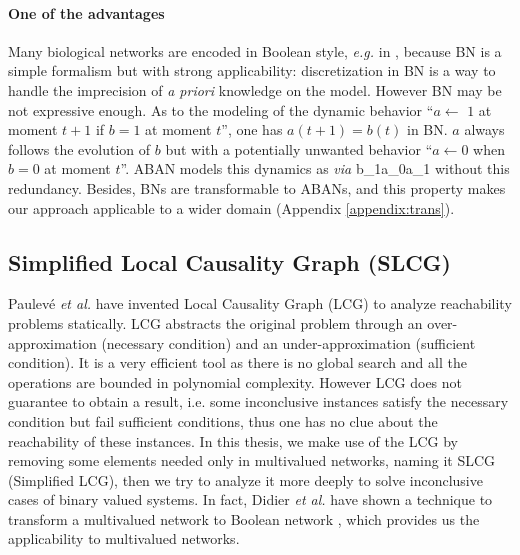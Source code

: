 \paragraph{\textbf{One of the advantages}}
Many biological networks are encoded in Boolean style, \textit{e.g.} in \cite{akutsu2007control,kauffman1969}, because BN is a simple formalism but with strong applicability: discretization in BN is a way to handle the imprecision of \textit{a priori} knowledge on the model.
However BN may be not expressive enough.
As to the modeling of the dynamic behavior ``$a\gets$ $1$ at moment $t+1$ if $b=1$ at moment $t$'', one has $a(t+1)=b(t)$ in BN.
$a$ always follows the evolution of $b$ but with a potentially unwanted behavior ``$a\gets 0$ when $b=0$ at moment $t$''.
ABAN models this dynamics as \textit{via} \ac{b_1}{a_0}{a_1} without this redundancy. 
Besides, BNs are transformable to ABANs, and this property makes our approach applicable to a wider domain (Appendix \ref{appendix:trans}).

\subsection{Simplified Local Causality Graph (SLCG)}\label{sec:SLCG}
Paulev\'e \textit{et al.} \cite{pauleve2011} have invented Local Causality Graph (LCG) to analyze reachability problems statically.
LCG abstracts the original problem through an over-approximation (necessary condition) and an under-approximation (sufficient condition).
It is a very efficient tool as there is no global search and all the operations are bounded in polynomial complexity.
However LCG does not guarantee to obtain a result, i.e. some inconclusive instances satisfy the necessary condition but fail sufficient conditions, thus one has no clue about the reachability of these instances.
In this thesis, we make use of the LCG by removing some elements needed only in multivalued networks, naming it SLCG (Simplified LCG), then we try to analyze it more deeply to solve inconclusive cases of binary valued systems.
In fact, Didier \textit{et al.} have shown a technique to transform a multivalued network to Boolean network \cite{didier2011mapping}, which provides us the applicability to multivalued networks.

